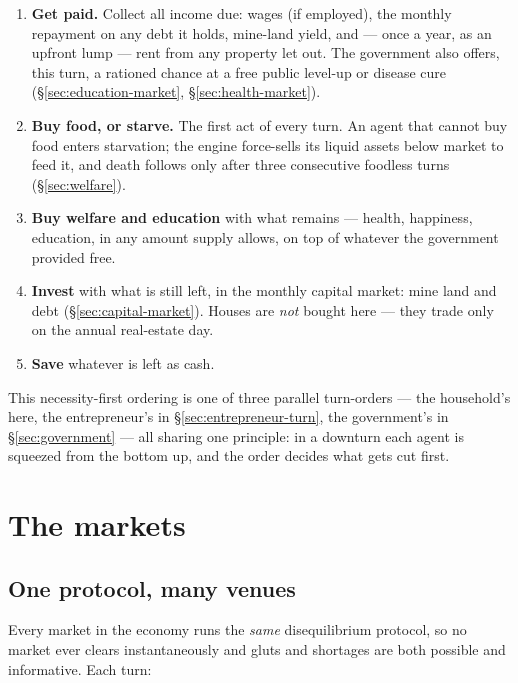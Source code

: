 \documentclass[11pt]{article}
\begin{document}
\begin{enumerate}
  \item \textbf{Get paid.} Collect all income due: wages (if employed), the
  monthly repayment on any debt it holds, mine-land yield, and --- once a year,
  as an upfront lump --- rent from any property let out. The government also
  offers, this turn, a rationed chance at a free public level-up or disease cure
  (\S\ref{sec:education-market}, \S\ref{sec:health-market}).
  \item \textbf{Buy food, or starve.} The first act of every turn. An agent that
  cannot buy food enters starvation; the engine force-sells its liquid assets
  below market to feed it, and death follows only after three consecutive
  foodless turns (\S\ref{sec:welfare}).
  \item \textbf{Buy welfare and education} with what remains --- health,
  happiness, education, in any amount supply allows, on top of whatever the
  government provided free.
  \item \textbf{Invest} with what is still left, in the monthly capital market:
  mine land and debt (\S\ref{sec:capital-market}). Houses are \emph{not} bought
  here --- they trade only on the annual real-estate day.
  \item \textbf{Save} whatever is left as cash.
\end{enumerate}

This necessity-first ordering is one of three parallel turn-orders --- the
household's here, the entrepreneur's in \S\ref{sec:entrepreneur-turn}, the
government's in \S\ref{sec:government} --- all sharing one principle: in a
downturn each agent is squeezed from the bottom up, and the order decides what
gets cut first.

\section{The markets}

\subsection{One protocol, many venues}
\label{sec:protocol}

Every market in the economy runs the \emph{same} disequilibrium protocol, so no
market ever clears instantaneously and gluts and shortages are both possible and
informative. Each turn:
\end{document}
